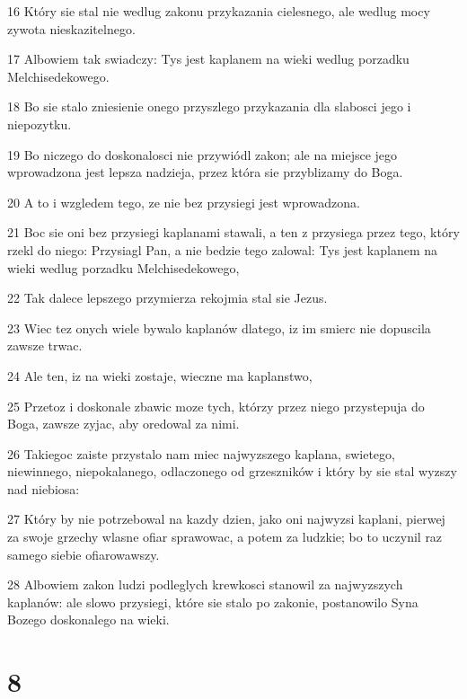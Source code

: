 \par 16 Który sie stal nie wedlug zakonu przykazania cielesnego, ale wedlug mocy zywota nieskazitelnego.
\par 17 Albowiem tak swiadczy: Tys jest kaplanem na wieki wedlug porzadku Melchisedekowego.
\par 18 Bo sie stalo zniesienie onego przyszlego przykazania dla slabosci jego i niepozytku.
\par 19 Bo niczego do doskonalosci nie przywiódl zakon; ale na miejsce jego wprowadzona jest lepsza nadzieja, przez która sie przyblizamy do Boga.
\par 20 A to i wzgledem tego, ze nie bez przysiegi jest wprowadzona.
\par 21 Boc sie oni bez przysiegi kaplanami stawali, a ten z przysiega przez tego, który rzekl do niego: Przysiagl Pan, a nie bedzie tego zalowal: Tys jest kaplanem na wieki wedlug porzadku Melchisedekowego,
\par 22 Tak dalece lepszego przymierza rekojmia stal sie Jezus.
\par 23 Wiec tez onych wiele bywalo kaplanów dlatego, iz im smierc nie dopuscila zawsze trwac.
\par 24 Ale ten, iz na wieki zostaje, wieczne ma kaplanstwo,
\par 25 Przetoz i doskonale zbawic moze tych, którzy przez niego przystepuja do Boga, zawsze zyjac, aby oredowal za nimi.
\par 26 Takiegoc zaiste przystalo nam miec najwyzszego kaplana, swietego, niewinnego, niepokalanego, odlaczonego od grzeszników i który by sie stal wyzszy nad niebiosa:
\par 27 Który by nie potrzebowal na kazdy dzien, jako oni najwyzsi kaplani, pierwej za swoje grzechy wlasne ofiar sprawowac, a potem za ludzkie; bo to uczynil raz samego siebie ofiarowawszy.
\par 28 Albowiem zakon ludzi podleglych krewkosci stanowil za najwyzszych kaplanów: ale slowo przysiegi, które sie stalo po zakonie, postanowilo Syna Bozego doskonalego na wieki.

\chapter{8}

